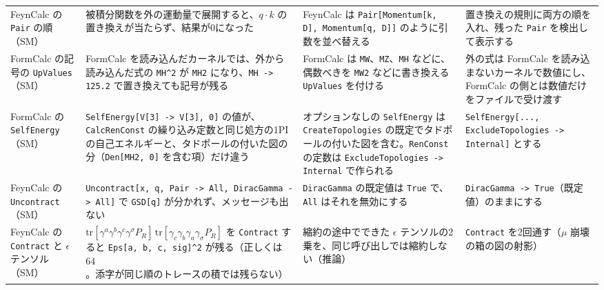 \documentclass[a4paper,10pt]{ltjsarticle}
\begin{document}
\begin{table}[tbp]
\begin{tabularx}{\linewidth}{>{\raggedright\arraybackslash}p{2.4cm}>{\raggedright\arraybackslash}X>{\raggedright\arraybackslash}X>{\raggedright\arraybackslash}X}
FeynCalc の \texttt{Pair} の順（SM） & 被積分関数を外の運動量で展開すると、$q\!\cdot\!k$ の置き換えが当たらず、結果が0になった & FeynCalc は \texttt{Pair[Momentum[k, D], Momentum[q, D]]} のように引数を並べ替える & 置き換えの規則に両方の順を入れ、残った \texttt{Pair} を検出して表示する \\
FormCalc の記号の \texttt{UpValues}（SM） & FormCalc を読み込んだカーネルでは、外から読み込んだ式の \texttt{MH\^{}2} が \texttt{MH2} になり、\texttt{MH -> 125.2} で置き換えても記号が残る & FormCalc は \texttt{MW}、\texttt{MZ}、\texttt{MH} などに、偶数べきを \texttt{MW2} などに書き換える \texttt{UpValues} を付ける & 外の式は FormCalc を読み込まないカーネルで数値にし、FormCalc の側とは数値だけをファイルで受け渡す \\
FormCalc の \texttt{SelfEnergy}（SM） & \texttt{SelfEnergy[V[3] -> V[3], 0]} の値が、\texttt{CalcRenConst} の繰り込み定数と同じ処方の1PI の自己エネルギーと、タドポールの付いた図の分（\texttt{Den[MH2, 0]} を含む項）だけ違う & オプションなしの \texttt{SelfEnergy} は \texttt{CreateTopologies} の既定でタドポールの付いた図を含む。\texttt{RenConst} の定数は \texttt{ExcludeTopologies -> Internal} で作られる & \texttt{SelfEnergy[..., ExcludeTopologies -> Internal]} とする \\
FeynCalc の \texttt{Uncontract}（SM） & \texttt{Uncontract[x, q, Pair -> All, DiracGamma -> All]} で \texttt{GSD[q]} が分かれず、メッセージも出ない & \texttt{DiracGamma} の既定値は \texttt{True} で、\texttt{All} はそれを無効にする & \texttt{DiracGamma -> True}（既定値）のままにする \\
FeynCalc の \texttt{Contract} と $\epsilon$ テンソル（SM） & $\mathrm{tr}[\gamma^a\gamma^b\gamma^c\gamma^\sigma P_R]\,\mathrm{tr}[\gamma_c\gamma_b\gamma_a\gamma_\sigma P_R]$ を \texttt{Contract} すると \texttt{Eps[a, b, c, sig]\^{}2} が残る（正しくは $64$。添字が同じ順のトレースの積では残らない） & 縮約の途中でできた $\epsilon$ テンソルの2乗を、同じ呼び出しでは縮約しない（推論） & \texttt{Contract} を2回通す（$\mu$ 崩壊の箱の図の射影） \\
\bottomrule
\end{tabularx}
\end{table}
\end{document}
